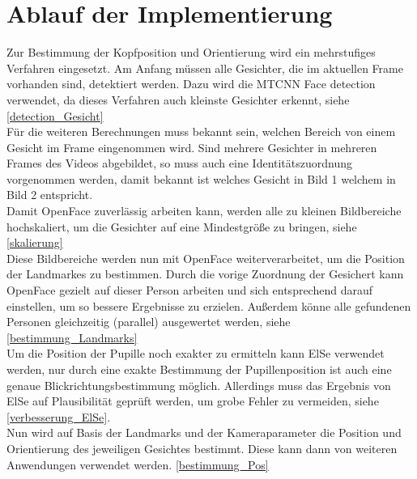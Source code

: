 \section{Ablauf der Implementierung}
Zur Bestimmung der Kopfposition und Orientierung wird ein mehrstufiges Verfahren eingesetzt. Am Anfang müssen alle Gesichter, die im aktuellen Frame vorhanden sind, detektiert werden. Dazu wird die MTCNN Face detection verwendet, da dieses Verfahren auch kleinste Gesichter erkennt, siehe \autoref{detection_Gesicht}\\
Für die weiteren Berechnungen muss bekannt sein, welchen Bereich von einem Gesicht im Frame eingenommen wird. Sind mehrere Gesichter in mehreren Frames des Videos abgebildet, so muss auch eine Identitätszuordnung vorgenommen werden, damit bekannt ist welches Gesicht in Bild 1 welchem in Bild 2 entspricht.\\
Damit OpenFace zuverlässig arbeiten kann, werden alle zu kleinen Bildbereiche hochskaliert, um die Gesichter auf eine Mindestgröße zu bringen, siehe \autoref{skalierung}\\
Diese Bildbereiche werden nun mit OpenFace weiterverarbeitet, um die Position der Landmarkes zu bestimmen. Durch die vorige Zuordnung der Gesichert kann OpenFace gezielt auf dieser Person arbeiten und sich entsprechend darauf einstellen, um so bessere Ergebnisse zu erzielen. Außerdem könne alle gefundenen Personen gleichzeitig (parallel) ausgewertet werden, siehe \autoref{bestimmung_Landmarks}\\
Um die Position der Pupille noch exakter zu ermitteln kann ElSe verwendet werden, nur durch eine exakte Bestimmung der Pupillenposition ist auch eine genaue Blickrichtungsbestimmung möglich. Allerdings muss das Ergebnis von ElSe auf Plausibilität geprüft werden, um grobe Fehler zu vermeiden, siehe \autoref{verbesserung_ElSe}.\\
Nun wird auf Basis der Landmarks und der Kameraparameter die Position und Orientierung des jeweiligen Gesichtes bestimmt. Diese kann dann von weiteren Anwendungen verwendet werden. \autoref{bestimmung_Pos}